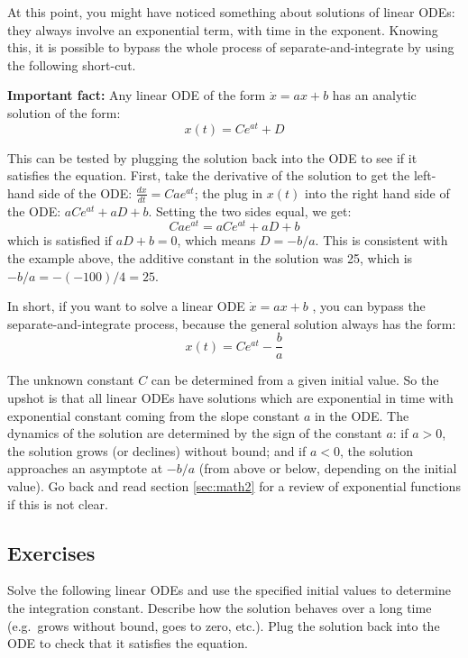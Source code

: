 \documentclass[
]{book}
\theoremstyle{definition}
\theoremstyle{definition}
\theoremstyle{definition}
\theoremstyle{remark}
\begin{document}
At this point, you might have noticed something about solutions of linear ODEs: they always involve an exponential term, with time in the exponent. Knowing this, it is possible to bypass the whole process of separate-and-integrate by using the following short-cut.

\textbf{Important fact:} Any linear ODE of the form \(\dot x= ax +b\) has an analytic solution of the form:
\[ x(t) = Ce^{at} + D\]

This can be tested by plugging the solution back into the ODE to see if it satisfies the equation. First, take the derivative of the solution to get the left-hand side of the ODE: \(\frac{dx}{dt} = Ca e^{at}\); the plug in \(x(t)\) into the right hand side of the ODE: \(aCe^{at} + aD +b\). Setting the two sides equal, we get:
\[Ca e^{at} = aCe^{at} + aD +b\]
which is satisfied if \(aD + b = 0\), which means \(D= -b/a\). This is consistent with the example above, the additive constant in the solution was 25, which is \(-b/a= -(-100)/4 = 25\).

In short, if you want to solve a linear ODE \(\dot x= ax +b\) , you can bypass the separate-and-integrate process, because the general solution always has the form:
\begin{equation}
x(t) = Ce^{at} - \frac{b}{a}
\label{eq:ch15_ode_sol}
\end{equation}

The unknown constant \(C\) can be determined from a given initial value. So the upshot is that all linear ODEs have solutions which are exponential in time with exponential constant coming from the slope constant \(a\) in the ODE. The dynamics of the solution are determined by the sign of the constant \(a\): if \(a>0\), the solution grows (or declines) without bound; and if \(a<0\), the solution approaches an asymptote at \(-b/a\) (from above or below, depending on the initial value). Go back and read section \ref{sec:math2} for a review of exponential functions if this is not clear.

\hypertarget{exercises-15}{%
\subsection{Exercises}\label{exercises-15}}

Solve the following linear ODEs and use the specified initial values to determine the integration constant. Describe how the solution behaves over a long time (e.g.~grows without bound, goes to zero, etc.). Plug the solution back into the ODE to check that it satisfies the equation.
\end{document}
